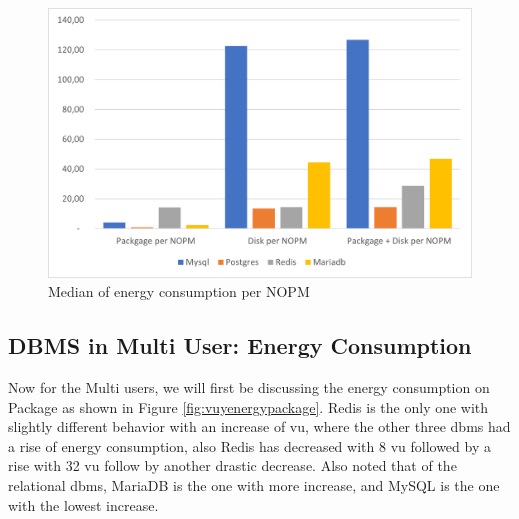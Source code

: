 \begin{figure}[H]
\centering
    \includegraphics[width=0.8\columnwidth]{results/median/energy-nopm.png}
\caption{Median of energy consumption per NOPM}
\label{fig:mediannopmenergy}\end{figure}








\subsection{DBMS in Multi User: Energy Consumption}






    Now for the Multi users, we will first be discussing the energy consumption on Package as shown in Figure \ref{fig:vuyenergypackage}.  Redis is the only one with slightly different behavior with an increase of \gls{vu},  where the other three \gls{dbms} had a rise of energy consumption, also Redis has decreased with 8 \gls{vu}  followed by a rise with 32 \gls{vu}  follow by another drastic decrease. Also noted that of the relational \gls{dbms}, MariaDB is the one with more increase, and MySQL is the one with the lowest increase.

